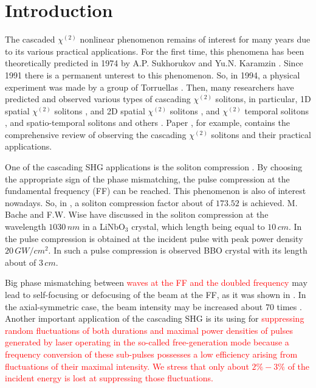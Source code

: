 \documentclass[a4paper, 12pt, onecolumn]{extarticle}
\begin{document}
\section{Introduction}
The cascaded \(\chi^{(2)}\) nonlinear phenomenon remains of interest for many years due to its various practical applications. For the first time, this phenomena has been theoretically predicted in 1974 by A.P. Sukhorukov and Yu.N. Karamzin \cite{bib:n1}. Since 1991 there is a permanent unterest to this phenomenon. So, in 1994, a physical experiment was made by a group of Torruellas \cite{bib:n2}. Then, many researchers have predicted and observed various types of cascading \(\chi^{(2)}\) solitons, in particular, 1D spatial \(\chi^{(2)}\) solitons \cite{bib:n3}, and 2D spatial \(\chi^{(2)}\) solitons \cite{bib:n2, bib:n4, bib:n5}, and \(\chi^{(2)}\) temporal solitons \cite{bib:n6}, and spatio-temporal solitons\cite{bib:n7} and others \cite{bib:n9,bib:n10}. Paper \cite{bib:n8}, for example, contains the comprehensive review of observing the cascading \(\chi^{(2)}\) solitons and their practical applications. 

One of the cascading SHG applications is the soliton compression \cite{bib:n11, bib:n12, bib:n13, bib:n14, bib:n15, bib:n16, bib:n17, bib:n18}. By choosing the appropriate sign of the phase mismatching, the pulse compression at the fundamental frequency (FF) can be reached. This phenomenon is also of interest nowadays. So, in \cite{bib:n11}, a soliton compression factor about of \(173.52\) is achieved. M. Bache and F.W. Wise have discussed in \cite{bib:n12} the soliton compression at the wavelength \(1030\,nm\) in a LiNbO$_3$ crystal, which length being equal to \(10\,cm\). In \cite{bib:n13} the pulse compression is obtained at the incident pulse with peak power density \(20\,GW/cm^2\). In \cite{bib:n14} such a pulse compression is observed BBO crystal with its length about of \(3\,cm\). 

Big phase mismatching between \textcolor{red}{  waves at the FF and the doubled frequency} may lead to self-focusing or defocusing of the beam at the FF, as it was shown in \cite{bib:n19}. In the axial-symmetric case, the beam intensity may be increased about 70 times \cite{bib:n20}. Another important application of the cascading SHG is its using for \textcolor{red}{  suppressing random fluctuations of both durations and  maximal power densities of pulses generated by  laser operating in the so-called free-generation mode \cite{bib:n21,bib:n22,bib:n23a,bib:n23}  because a frequency conversion of these sub-pulses possesses a low efficiency arising from fluctuations of their maximal intensity. We stress that only about \(2\%-3\%\) of the incident energy is lost  at suppressing those fluctuations.}
\end{document}
